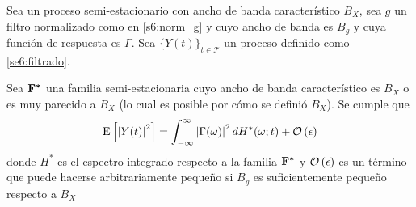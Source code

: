 \begin{teorema}
Sea \xt un proceso semi-estacionario con ancho de banda característico $B_X$, sea $g$ un filtro normalizado como en \ref{s6:norm_g} y cuyo ancho de banda es $B_g$ y cuya función de respuesta es $\Gamma$. 
%
Sea $\{Y(t)\}_{t\in \mathcal{T}}$ un proceso definido como \ref{se6:filtrado}.

Sea $\mathbf{F}^{\boldsymbol{*}}$ una familia semi-estacionaria cuyo ancho de banda característico es $B_X$ o es muy parecido a $B_X$ (lo cual es posible por cómo se definió $B_X$).
%
Se cumple que
\begin{equation}
\mathrm{E}\left[ \left| Y(t) \right|^{2} \right] = \int_{-\infty}^{\infty} \left| \Gamma(\omega) \right|^{2} dH^{*}(\omega; t) + \mathcal{O}\left( \epsilon \right)
\end{equation}
donde $H^{*}$ es el espectro integrado respecto a la familia $\mathbf{F}^{\boldsymbol{*}}$ y $\mathcal{O}\left( \epsilon \right)$ es un término que puede hacerse arbitrariamente pequeño si $B_g$ es suficientemente pequeño respecto a $B_X$
\label{teo:aprox_orden}
\end{teorema}

